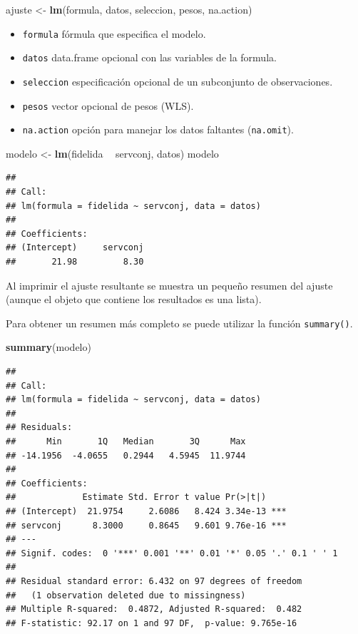 \documentclass[]{book}
\newenvironment{Shaded}{\begin{snugshade}}{\end{snugshade}}
\newcommand{\KeywordTok}[1]{\textcolor[rgb]{0.13,0.29,0.53}{\textbf{#1}}}
\newcommand{\StringTok}[1]{\textcolor[rgb]{0.31,0.60,0.02}{#1}}
\newcommand{\OperatorTok}[1]{\textcolor[rgb]{0.81,0.36,0.00}{\textbf{#1}}}
\newcommand{\NormalTok}[1]{#1}
\providecommand{\tightlist}{%
  \setlength{\itemsep}{0pt}\setlength{\parskip}{0pt}}
\begin{document}
\begin{Shaded}
\begin{Highlighting}[]
\NormalTok{ajuste <-}\StringTok{ }\KeywordTok{lm}\NormalTok{(formula, datos, seleccion, pesos, na.action)}
\end{Highlighting}
\end{Shaded}

\begin{itemize}
\tightlist
\item
  \texttt{formula} fórmula que especifica el modelo.
\item
  \texttt{datos} data.frame opcional con las variables de la formula.
\item
  \texttt{seleccion} especificación opcional de un subconjunto de
  observaciones.
\item
  \texttt{pesos} vector opcional de pesos (WLS).
\item
  \texttt{na.action} opción para manejar los datos faltantes
  (\texttt{na.omit}).
\end{itemize}

\begin{Shaded}
\begin{Highlighting}[]
\NormalTok{modelo <-}\StringTok{ }\KeywordTok{lm}\NormalTok{(fidelida }\OperatorTok{~}\StringTok{ }\NormalTok{servconj, datos)}
\NormalTok{modelo}
\end{Highlighting}
\end{Shaded}

\begin{verbatim}
## 
## Call:
## lm(formula = fidelida ~ servconj, data = datos)
## 
## Coefficients:
## (Intercept)     servconj  
##       21.98         8.30
\end{verbatim}

Al imprimir el ajuste resultante se muestra un pequeño resumen del
ajuste (aunque el objeto que contiene los resultados es una lista).

Para obtener un resumen más completo se puede utilizar la función
\texttt{summary()}.

\begin{Shaded}
\begin{Highlighting}[]
\KeywordTok{summary}\NormalTok{(modelo)}
\end{Highlighting}
\end{Shaded}

\begin{verbatim}
## 
## Call:
## lm(formula = fidelida ~ servconj, data = datos)
## 
## Residuals:
##      Min       1Q   Median       3Q      Max 
## -14.1956  -4.0655   0.2944   4.5945  11.9744 
## 
## Coefficients:
##             Estimate Std. Error t value Pr(>|t|)    
## (Intercept)  21.9754     2.6086   8.424 3.34e-13 ***
## servconj      8.3000     0.8645   9.601 9.76e-16 ***
## ---
## Signif. codes:  0 '***' 0.001 '**' 0.01 '*' 0.05 '.' 0.1 ' ' 1
## 
## Residual standard error: 6.432 on 97 degrees of freedom
##   (1 observation deleted due to missingness)
## Multiple R-squared:  0.4872, Adjusted R-squared:  0.482 
## F-statistic: 92.17 on 1 and 97 DF,  p-value: 9.765e-16
\end{verbatim}
\end{document}

